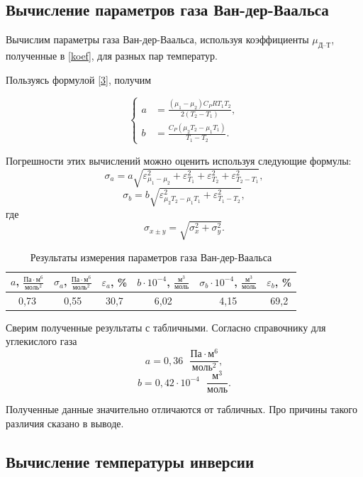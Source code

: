 \documentclass[a4paper,12pt]{article} %
\begin{document}
\subsection{Вычисление параметров газа Ван-дер-Ваальса}

Вычислим параметры газа Ван-дер-Ваальса, используя коэффициенты $ \mu_\text{Д--Т} $, полученные в \ref{koef}, для разных пар температур.

Пользуясь формулой \eqref{3}, получим 

\[ \left\{ \begin{aligned}
	 a &= \frac{\left(\mu_1 - \mu_2\right)C_PRT_1T_2}{2\left(T_2-T_1\right)}, \\
	b &= \frac{C_P(\mu_2T_2-\mu_1T_1)}{T_1-T_2}. \end{aligned} \right. \]

Погрешности этих вычислений можно оценить используя следующие формулы:~\[ \sigma_a = a\sqrt{\varepsilon^2_{\mu_1-\mu_2}+\varepsilon^2_{T_1}+\varepsilon^2_{T_2}+\varepsilon^2_{T_2-T_1}}, \] \[ \sigma_b=b\sqrt{\varepsilon^2_{\mu_2T_2-\mu_1T_1}+\varepsilon^2_{T_1-T_2}}, \] где \[ \sigma_{x\pm y} =\sqrt{\sigma^2_x+\sigma^2_y}. \]

\begin{table}[H]
	\centering
	\begin{tabular}{|c|c|c|c|c|c|}
		\hline
		$ a $, $\displaystyle \frac{\text{Па}\cdot\text{м}^6}{\text{моль}^2} $ &$ \sigma_a $, $\displaystyle \frac{\text{Па}\cdot\text{м}^6}{\text{моль}^2} $ & $ \varepsilon_a $, \% & $ b\cdot10^{-4} $, $ \displaystyle\frac{\text{м}^3}{\text{моль}} $ & $ \sigma_b \cdot 10^{-4} $, $\displaystyle \frac{\text{м}^3}{\text{моль}} $ & $ \varepsilon_b $, \% \\ \hline
		0,73 & 0,55 & 30,7 & 6,02 & 4,15 & 69,2 \\ \hline
	\end{tabular}
	\caption{Результаты измерения параметров газа Ван-дер-Ваальса}
	\label{tab:a-b}
\end{table}

Сверим полученные результаты с табличными. Согласно справочнику для углекислого газа \[ a = 0,36 \text{ } \frac{\text{Па}\cdot\text{м}^6}{\text{моль}^2}, \] \[ b = 0,42\cdot 10^{-4} \text{ }\frac{\text{м}^3}{\text{моль}}. \]

Полученные данные значительно отличаются от табличных. Про причины такого различия сказано в выводе.

\subsection{Вычисление температуры инверсии}
\end{document}
